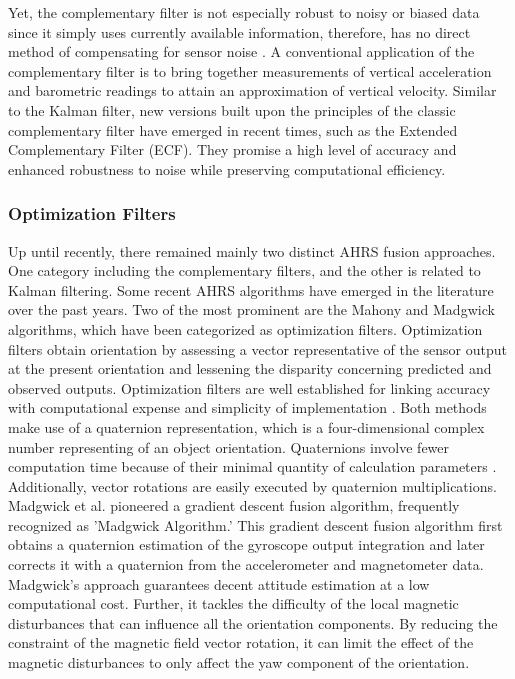 Yet, the complementary filter is not especially robust to noisy or biased data since it simply uses currently available information, therefore, has no direct method of compensating for sensor noise \cite{wilson2019formulation}. A conventional application of the complementary filter is to bring together measurements of vertical acceleration and barometric readings to attain an approximation of vertical velocity. Similar to the Kalman filter, new versions built upon the principles of the classic complementary filter have emerged in recent times, such as the Extended Complementary Filter (ECF). They promise a high level of accuracy and enhanced robustness to noise while preserving computational efficiency.

\subsubsection{Optimization Filters}

Up until recently, there remained mainly two distinct AHRS fusion approaches. One category including the complementary filters, and the other is related to Kalman filtering. Some recent AHRS algorithms have emerged in the literature over the past years. Two of the most prominent are the Mahony and Madgwick algorithms, which have been categorized as optimization filters. Optimization filters obtain orientation by assessing a vector representative of the sensor output at the present orientation and lessening the disparity concerning predicted and observed outputs. Optimization filters are well established for linking accuracy with computational expense and simplicity of implementation \cite{madgwick2020extended}.
Both methods make use of a quaternion representation, which is a four-dimensional complex number representing of an object orientation. Quaternions involve fewer computation time because of their minimal quantity of calculation parameters \cite{ludwig2018comparison}. Additionally, vector rotations are easily executed by quaternion multiplications.
Madgwick et al. \cite{madgwick2010efficient} pioneered a gradient descent fusion algorithm, frequently recognized as 'Madgwick Algorithm.' This gradient descent fusion algorithm first obtains a quaternion estimation of the gyroscope output integration and later corrects it with a quaternion from the accelerometer and magnetometer data. Madgwick's approach guarantees decent attitude estimation at a low computational cost. Further, it tackles the difficulty of the local magnetic disturbances that can influence all the orientation components. By reducing the constraint of the magnetic field vector rotation, it can limit the effect of the magnetic disturbances to only affect the yaw component of the orientation.

